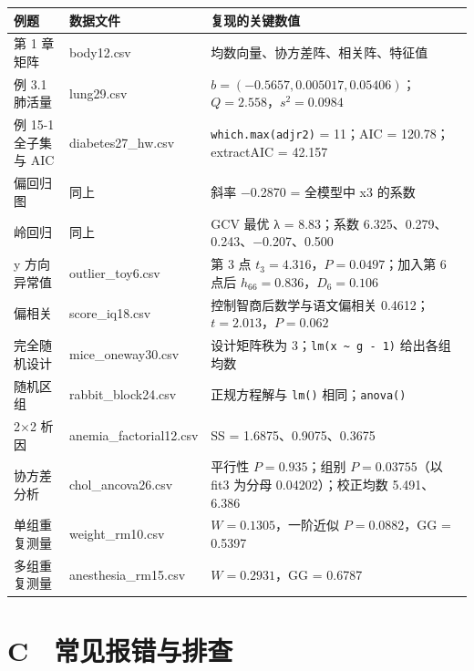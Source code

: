 \begin{tabular}{p{3.2cm}p{3.8cm}p{7.0cm}}
\toprule
例题 & 数据文件 & 复现的关键数值\\
\midrule
第 1 章 矩阵 & body12.csv & 均数向量、协方差阵、相关阵、特征值\\
例 3.1 肺活量 & lung29.csv & $b=(-0.5657, 0.005017, 0.05406)$；$Q=2.558$，$s^2=0.0984$\\
例 15-1 全子集与 AIC & diabetes27\_hw.csv & \Verb|which.max(adjr2)| = 11；AIC = 120.78；extractAIC = 42.157\\
偏回归图 & 同上 & 斜率 −0.2870 = 全模型中 x3 的系数\\
岭回归 & 同上 & GCV 最优 λ = 8.83；系数 6.325、0.279、0.243、−0.207、0.500\\
y 方向异常值 & outlier\_toy6.csv & 第 3 点 $t_3=4.316$，$P=0.0497$；加入第 6 点后 $h_{66}=0.836$，$D_6=0.106$\\
偏相关 & score\_iq18.csv & 控制智商后数学与语文偏相关 0.4612；$t=2.013$，$P=0.062$\\
完全随机设计 & mice\_oneway30.csv & 设计矩阵秩为 3；\Verb|lm(x ~ g - 1)| 给出各组均数\\
随机区组 & rabbit\_block24.csv & 正规方程解与 \Verb|lm()| 相同；\Verb|anova()|\\
2×2 析因 & anemia\_factorial12.csv & SS = 1.6875、0.9075、0.3675\\
协方差分析 & chol\_ancova26.csv & 平行性 $P=0.935$；组别 $P=0.03755$（以 fit3 为分母 0.04202）；校正均数 5.491、6.386\\
单组重复测量 & weight\_rm10.csv & $W=0.1305$，一阶近似 $P=0.0882$，GG = 0.5397\\
多组重复测量 & anesthesia\_rm15.csv & $W=0.2931$，GG = 0.6787\\
\bottomrule
\end{tabular}


\section{C　常见报错与排查}
\label{app:errors}


